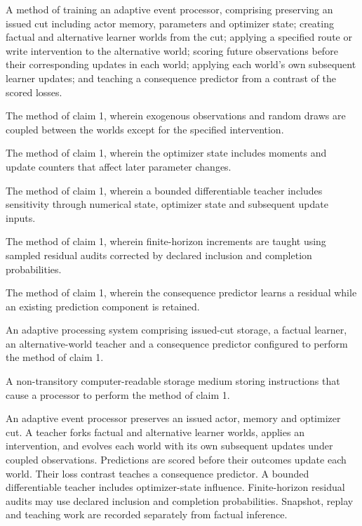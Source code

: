 \documentclass[pct]{sm-patent}
\begin{document}
\begin{patentclaims}

\item A method of training an adaptive event processor, comprising preserving an issued cut including actor memory, parameters and optimizer state; creating factual and alternative learner worlds from the cut; applying a specified route or write intervention to the alternative world; scoring future observations before their corresponding updates in each world; applying each world's own subsequent learner updates; and teaching a consequence predictor from a contrast of the scored losses.

\item The method of claim 1, wherein exogenous observations and random draws are coupled between the worlds except for the specified intervention.

\item The method of claim 1, wherein the optimizer state includes moments and update counters that affect later parameter changes.

\item The method of claim 1, wherein a bounded differentiable teacher includes sensitivity through numerical state, optimizer state and subsequent update inputs.

\item The method of claim 1, wherein finite-horizon increments are taught using sampled residual audits corrected by declared inclusion and completion probabilities.

\item The method of claim 1, wherein the consequence predictor learns a residual while an existing prediction component is retained.

\item An adaptive processing system comprising issued-cut storage, a factual learner, an alternative-world teacher and a consequence predictor configured to perform the method of claim 1.

\item A non-transitory computer-readable storage medium storing instructions that cause a processor to perform the method of claim 1.

\end{patentclaims}

\abstractstart

An adaptive event processor preserves an issued actor, memory and optimizer cut. A teacher forks factual and alternative learner worlds, applies an intervention, and evolves each world with its own subsequent updates under coupled observations. Predictions are scored before their outcomes update each world. Their loss contrast teaches a consequence predictor. A bounded differentiable teacher includes optimizer-state influence. Finite-horizon residual audits may use declared inclusion and completion probabilities. Snapshot, replay and teaching work are recorded separately from factual inference.
\end{document}

